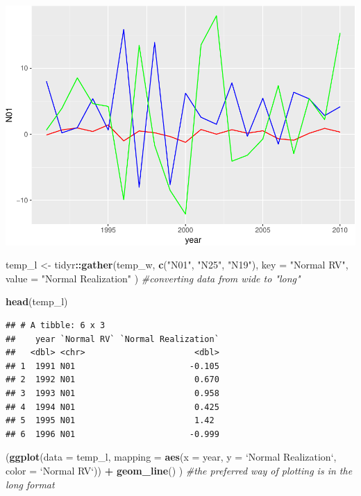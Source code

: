 \documentclass[12pt,]{article}
\newenvironment{Shaded}{\begin{snugshade}}{\end{snugshade}}
\newcommand{\KeywordTok}[1]{\textcolor[rgb]{0.13,0.29,0.53}{\textbf{#1}}}
\newcommand{\DataTypeTok}[1]{\textcolor[rgb]{0.13,0.29,0.53}{#1}}
\newcommand{\StringTok}[1]{\textcolor[rgb]{0.31,0.60,0.02}{#1}}
\newcommand{\CommentTok}[1]{\textcolor[rgb]{0.56,0.35,0.01}{\textit{#1}}}
\newcommand{\OperatorTok}[1]{\textcolor[rgb]{0.81,0.36,0.00}{\textbf{#1}}}
\newcommand{\NormalTok}[1]{#1}
\begin{document}
\includegraphics{Intro_graphics_files/figure-latex/wide_vs_long-1.pdf}

\begin{Shaded}
\begin{Highlighting}[]
\NormalTok{temp_l <-}\StringTok{ }\NormalTok{tidyr}\OperatorTok{::}\KeywordTok{gather}\NormalTok{(temp_w, }\KeywordTok{c}\NormalTok{(}\StringTok{"N01"}\NormalTok{, }\StringTok{"N25"}\NormalTok{, }\StringTok{"N19"}\NormalTok{), }
                        \DataTypeTok{key =} \StringTok{"Normal RV"}\NormalTok{, }
                        \DataTypeTok{value =} \StringTok{"Normal Realization"}
\NormalTok{                        ) }\CommentTok{#converting data from wide to "long"}

\KeywordTok{head}\NormalTok{(temp_l)}
\end{Highlighting}
\end{Shaded}

\begin{verbatim}
## # A tibble: 6 x 3
##    year `Normal RV` `Normal Realization`
##   <dbl> <chr>                      <dbl>
## 1  1991 N01                       -0.105
## 2  1992 N01                        0.670
## 3  1993 N01                        0.958
## 4  1994 N01                        0.425
## 5  1995 N01                        1.42 
## 6  1996 N01                       -0.999
\end{verbatim}

\begin{Shaded}
\begin{Highlighting}[]
\NormalTok{(}\KeywordTok{ggplot}\NormalTok{(}\DataTypeTok{data =}\NormalTok{ temp_l,}
        \DataTypeTok{mapping =} \KeywordTok{aes}\NormalTok{(}\DataTypeTok{x =}\NormalTok{ year, }
                      \DataTypeTok{y =} \StringTok{`}\DataTypeTok{Normal Realization}\StringTok{`}\NormalTok{,}
                      \DataTypeTok{color =} \StringTok{`}\DataTypeTok{Normal RV}\StringTok{`}\NormalTok{)) }\OperatorTok{+}
\StringTok{    }\KeywordTok{geom_line}\NormalTok{()}
\NormalTok{  ) }\CommentTok{#the preferred way of plotting is in the long format}
\end{Highlighting}
\end{Shaded}
\end{document}
